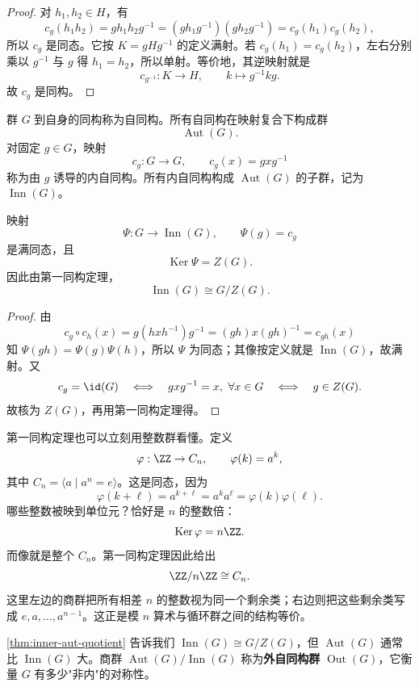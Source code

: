 \begin{proof}
对 $h_1,h_2\in H$，有
\[
c_g(h_1h_2)=gh_1h_2g^{-1}
=(gh_1g^{-1})(gh_2g^{-1})
=c_g(h_1)c_g(h_2),
\]
所以 $c_g$ 是同态。它按 $K=gHg^{-1}$ 的定义满射。若 $c_g(h_1)=c_g(h_2)$，左右分别乘以 $g^{-1}$ 与 $g$ 得 $h_1=h_2$，所以单射。等价地，其逆映射就是
\[
c_{g^{-1}}:K\to H,
\qquad k\mapsto g^{-1}kg.
\]
故 $c_g$ 是同构。
\end{proof}

\begin{definition}[自同构与内自同构]
群 $G$ 到自身的同构称为自同构。所有自同构在映射复合下构成群
\[
\operatorname{Aut}(G).
\]
对固定 $g\in G$，映射
\[
c_g:G\to G,
\qquad
c_g(x)=gxg^{-1}
\]
称为由 $g$ 诱导的内自同构。所有内自同构构成 $\operatorname{Aut}(G)$ 的子群，记为 $\operatorname{Inn}(G)$。
\label{def:automorphism-inner}
\end{definition}

\begin{theorem}[内自同构群的结构]
映射
\[
\Psi:G\longrightarrow\operatorname{Inn}(G),
\qquad
\Psi(g)=c_g
\]
是满同态，且
\[
\operatorname{Ker}\Psi=Z(G).
\]
因此由第一同构定理，
\[
\operatorname{Inn}(G)\cong G/Z(G).
\label{eq:inner-aut-quotient}
\]
\label{thm:inner-aut-quotient}

\end{theorem}

\begin{proof}
由
\[
c_g\circ c_h(x)
=g(hxh^{-1})g^{-1}
=(gh)x(gh)^{-1}
=c_{gh}(x)
\]
知 $\Psi(gh)=\Psi(g)\Psi(h)$，所以 $\Psi$ 为同态；其像按定义就是 $\operatorname{Inn}(G)$，故满射。又
\[
c_g=\id(G)
\quad\Longleftrightarrow\quad
gxg^{-1}=x,\ \forall x\in G
\quad\Longleftrightarrow\quad
g\in Z(G).
\]
故核为 $Z(G)$，再用第一同构定理得。
\end{proof}

第一同构定理也可以立刻用整数群看懂。定义
\[
\varphi:\ZZ\to C_n,\qquad \varphi(k)=a^k,
\]
其中 $C_n=\langle a\mid a^n=e\rangle$。这是同态，因为
\[
\varphi(k+\ell)=a^{k+\ell}=a^ka^\ell=\varphi(k)\varphi(\ell).
\]
哪些整数被映到单位元？恰好是 $n$ 的整数倍：
\[
\operatorname{Ker}\varphi=n\ZZ.
\]
而像就是整个 $C_n$。第一同构定理因此给出
\[
\ZZ/n\ZZ\cong C_n.
\]
这里左边的商群把所有相差 $n$ 的整数视为同一个剩余类；右边则把这些剩余类写成 $e,a,\dots,a^{n-1}$。这正是模 $n$ 算术与循环群之间的结构等价。


\cref{thm:inner-aut-quotient} 告诉我们 $\operatorname{Inn}(G)\cong G/Z(G)$，但 $\operatorname{Aut}(G)$ 通常比 $\operatorname{Inn}(G)$ 大。商群 $\operatorname{Aut}(G)/\operatorname{Inn}(G)$ 称为\textbf{外自同构群} $\operatorname{Out}(G)$，它衡量 $G$ 有多少"非内"的对称性。

